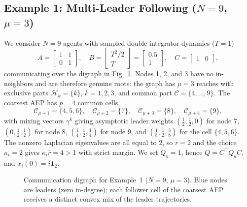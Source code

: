 \documentclass[final,5p,times]{elsarticle}
\theoremstyle{plain}
\theoremstyle{definition}
\theoremstyle{remark}
\newcommand{\ones}{\mathbf{1}}
\begin{document}
\subsection{Example 1: Multi-Leader Following (\texorpdfstring{$N = 9$, $\mu = 3$}{N = 9, mu = 3})}
\label{subsec:sim1}
We consider $N = 9$ agents with sampled double integrator dynamics ($T = 1$)
\begin{equation}
A = \begin{bmatrix} 1 & 1 \\ 0 & 1 \end{bmatrix}, \quad
B = \begin{bmatrix} T^2/2 \\ T \end{bmatrix} = \begin{bmatrix} 0.5 \\ 1 \end{bmatrix}, \quad
C = \begin{bmatrix} 1 & 0 \end{bmatrix},
\label{eq:AB_ex1}
\end{equation}
communicating over the digraph in Fig.~\ref{fig:graph9}. Nodes 1, 2, and 3 have no in-neighbors and are therefore genuine roots: the graph has $\mu = 3$ reaches with exclusive parts $\mathcal{H}_k = \{k\}$, $k = 1,2,3$, and common part $\mathcal{C} = \{4,\ldots,9\}$. The coarsest AEP has $p = 4$ common cells,
\begin{equation*}
\mathcal{C}_{\mu+1} = \{4,5,6\}, \quad \mathcal{C}_{\mu+2} = \{7\}, \quad \mathcal{C}_{\mu+3} = \{8\}, \quad \mathcal{C}_{\mu+4} = \{9\},
\end{equation*}
with mixing vectors $\gamma^{k}$ giving asymptotic leader weights $(\tfrac12,\tfrac12,0)$ for node 7, $(0,\tfrac12,\tfrac12)$ for node 8, $(\tfrac14,\tfrac12,\tfrac14)$ for node 9, and $(\tfrac18,\tfrac12,\tfrac38)$ for the cell $\{4,5,6\}$. The nonzero Laplacian eigenvalues are all equal to $2$, so $\bar{r} = 2$ and the choice $\kappa_i = 2$ gives $\kappa_i\bar{r} = 4 > 1$ with strict margin. We set $Q_y = 1$, hence $Q = C^\top Q_y C$, and $x_i(0) = i\ones_2$.
\begin{figure}[!htbp]
\centering
{}
\caption{Communication digraph for Example~1 ($N=9$, $\mu=3$). Blue nodes are leaders (zero in-degree); each follower cell of the coarsest AEP receives a distinct convex mix of the leader trajectories.}
\label{fig:graph9}
\end{figure}
\end{document}
